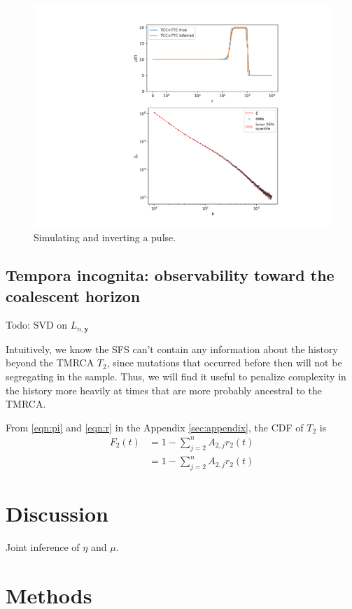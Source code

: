 \documentclass[11pt]{article}
\begin{document}
\begin{figure}
  \centering
  \includegraphics[width=.7\textwidth]{figures/fit_teaser}
  \caption{Simulating and inverting a pulse.}
  \label{}
\end{figure}

\subsection*{Tempora incognita: observability toward the coalescent horizon}\label{sec:model:loss}

Todo: SVD on $L_{n, \boldsymbol y}$

Intuitively, we know the SFS can't contain any information about the history beyond the TMRCA $T_2$, since mutations that occurred before then will not be segregating in the sample.
Thus, we will find it useful to penalize complexity in the history more heavily at times that are more probably ancestral to the TMRCA.

From \eqref{eqn:pi} and \eqref{eqn:r} in the Appendix \ref{sec:appendix}, the CDF of $T_2$ is
\begin{align}
F_2(t) &= 1 - \sum_{j=2}^n A_{2,j}r_2(t)\\
&= 1 - \sum_{j=2}^n A_{2,j}r_2(t)
\end{align}


\section*{Discussion}\label{sec:discussion}

Joint inference of $\eta$ and $\mu$.


\section*{Methods}\label{sec:methods}
\end{document}
